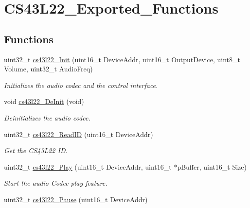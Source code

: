 \hypertarget{group___c_s43_l22___exported___functions}{}\section{C\+S43\+L22\+\_\+\+Exported\+\_\+\+Functions}
\label{group___c_s43_l22___exported___functions}
\subsection*{Functions}
\begin{DoxyCompactItemize}
\item 
uint32\+\_\+t \mbox{\hyperlink{group___c_s43_l22___exported___functions_ga47b373a281c7ba0ea0fac752f3d0a903}{cs43l22\+\_\+\+Init}} (uint16\+\_\+t Device\+Addr, uint16\+\_\+t Output\+Device, uint8\+\_\+t Volume, uint32\+\_\+t Audio\+Freq)
\begin{DoxyCompactList}\small\item\em Initializes the audio codec and the control interface. \end{DoxyCompactList}\item 
void \mbox{\hyperlink{group___c_s43_l22___exported___functions_gaeba1251bafcbeacb591dfe8cb8175447}{cs43l22\+\_\+\+De\+Init}} (void)
\begin{DoxyCompactList}\small\item\em Deinitializes the audio codec. \end{DoxyCompactList}\item 
uint32\+\_\+t \mbox{\hyperlink{group___c_s43_l22___exported___functions_gad4e4e8b889500f0e64c546a31d4b6dca}{cs43l22\+\_\+\+Read\+ID}} (uint16\+\_\+t Device\+Addr)
\begin{DoxyCompactList}\small\item\em Get the C\+S43\+L22 ID. \end{DoxyCompactList}\item 
uint32\+\_\+t \mbox{\hyperlink{group___c_s43_l22___exported___functions_ga1a210c3782b3d56db00565d4699f4c89}{cs43l22\+\_\+\+Play}} (uint16\+\_\+t Device\+Addr, uint16\+\_\+t $\ast$p\+Buffer, uint16\+\_\+t Size)
\begin{DoxyCompactList}\small\item\em Start the audio Codec play feature. \end{DoxyCompactList}\item 
uint32\+\_\+t \mbox{\hyperlink{group___c_s43_l22___exported___functions_gafc49ea6a76539430cd303849b60ae38d}{cs43l22\+\_\+\+Pause}} (uint16\+\_\+t Device\+Addr)

\end{DoxyCompactItemize}
